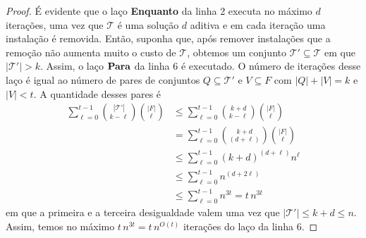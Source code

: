 \begin{proof}
    É evidente que o laço {\bf Enquanto} da linha 2 executa no máximo $d$ iterações, uma vez que $\mathcal{T}$ é uma solução $d$ aditiva e em cada iteração uma instalação é removida. Então, suponha que, após remover instalações que a remoção não aumenta muito o custo de $\mathcal{T}$, obtemos um conjunto $\mathcal{T}' \subseteq \mathcal{T}$ em que $|\mathcal{T}'| > k$. Assim, o laço ${\bf Para}$ da linha 6 é executado.
    O número de iterações desse laço é igual ao número de pares de conjuntos $Q \subseteq \mathcal{T}'$ e $V \subseteq F$ com $|Q| + |V| = k$ e $|V|<t$. A quantidade desses pares é
    \begin{align}
        \sum_{\ell = 0}^{t-1}\binom{|\mathcal{T}'|}{k - \ell}\binom{|F|}{\ell} &\leq \sum_{\ell = 0}^{t-1}\binom{k+d}{k - \ell}\binom{|F|}{\ell} \nonumber \\
        &= \sum_{\ell = 0}^{t-1}\binom{k+d}{(d + \ell)}\binom{|F|}{\ell} \nonumber \\
        &\leq \sum_{\ell = 0}^{t-1} (k+d)^{(d+\ell)} n^{\ell}\nonumber \\
        &\leq \sum_{\ell =0}^{t-1} n^{(d + 2\ell)} \nonumber \\
        &\leq \sum_{\ell = 0}^{t-1} n^{3t} = t \,n^{3t} \nonumber
    \end{align}
    em que a primeira e a terceira desigualdade valem uma vez que $|\mathcal{T}'| \leq k + d \leq n$. Assim, temos no máximo $t \, n^{3t} = t \, n^{O(t)}$ iterações do laço da linha 6.
\end{proof}


